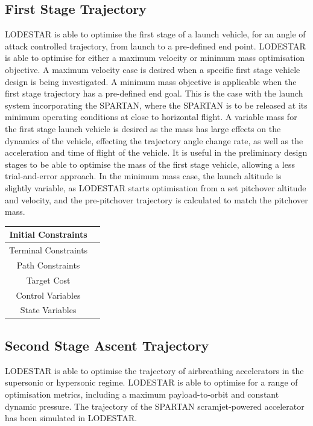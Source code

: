 \subsection{First Stage Trajectory}



LODESTAR is able to optimise the first stage of a launch vehicle, for an angle of attack controlled trajectory, from launch to a pre-defined end point. 
LODESTAR is able to optimise for either a maximum velocity or minimum mass optimisation objective. 
A maximum velocity case is desired when a specific first stage vehicle design is being investigated. 
A minimum mass objective is applicable when the first stage trajectory has a pre-defined end goal. This is the case with the launch system incorporating the SPARTAN, where the SPARTAN is to be released at its minimum operating conditions at close to horizontal flight. 
A variable mass for the first stage launch vehicle is desired as the mass has large effects on the dynamics of the vehicle, effecting the trajectory angle change rate, as well as the acceleration and time of flight of the vehicle.
It is useful in the preliminary design stages to be able to optimise the mass of the first stage vehicle, allowing a less trial-and-error approach.
In the minimum mass case, the launch altitude is slightly variable, as LODESTAR starts optimisation from a set pitchover altitude and velocity, and the pre-pitchover trajectory is calculated to match the pitchover mass. 



\begin{tabular}{|c|c|}
	\hline Initial Constraints  & \\ 
	\hline Terminal Constraints &  \\ 
	\hline Path Constraints &  \\ 
	\hline Target Cost &  \\ 
		\hline Control Variables &  \\ 
		\hline State Variables &  \\ 
	\hline 
\end{tabular} 



\subsection{Second Stage Ascent Trajectory}




LODESTAR is able to optimise the trajectory of airbreathing accelerators in the supersonic or hypersonic regime. LODESTAR is able to optimise for a range of optimisation metrics, including a maximum payload-to-orbit and constant dynamic pressure.  
The trajectory of the SPARTAN scramjet-powered accelerator has been simulated in LODESTAR. 

